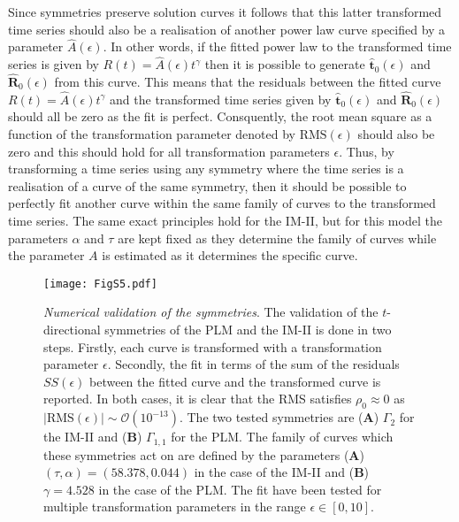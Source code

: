 Since symmetries preserve solution curves it follows that this latter transformed time series should also be a realisation of another power law curve specified by a parameter $\hat{A}(\epsilon)$. In other words, if the fitted power law to the transformed time series is given by $R(t)=\hat{A}(\epsilon)t^{\gamma}$ then it is possible to generate $\mathbf{\hat{t}}_0(\epsilon)$ and $\mathbf{\hat{R}}_0(\epsilon)$ from this curve. This means that the residuals between the fitted curve $R(t)=\hat{A}(\epsilon)t^{\gamma}$ and the transformed time series given by $\mathbf{\hat{t}}_0(\epsilon)$ and $\mathbf{\hat{R}}_0(\epsilon)$ should all be zero as the fit is perfect. Consquently, the root mean square as a function of the transformation parameter denoted by $\mathrm{RMS}(\epsilon)$ should also be zero and this should hold for all transformation parameters $\epsilon$. Thus, by transforming a time series using any symmetry where the time series is a realisation of a curve of the same symmetry, then it should be possible to perfectly fit another curve within the same family of curves to the transformed time series. The same exact principles hold for the IM-II, but for this model the parameters $\alpha$ and $\tau$ are kept fixed as they determine the family of curves while the parameter $A$ is estimated as it determines the specific curve.

   





\begin{figure}[htbp!]
  \texttt{[image: FigS5.pdf]}
  \caption[Numerical validation of the symmetries]{\textit{Numerical validation of the symmetries}. The validation of the $t$-directional symmetries of the PLM and the IM-II is done in two steps. Firstly, each curve is transformed with a transformation parameter $\epsilon$. Secondly, the fit in terms of the sum of the residuals $SS(\epsilon)$ between the fitted curve and the transformed curve is reported. In both cases, it is clear that the RMS satisfies $\rho_0\approx 0$ as $|\mathrm{RMS}(\epsilon)|\sim\mathcal{O}\left(10^{-13}\right)$. The two tested symmetries are (\textbf{A}) $\Gamma_2$ for the IM-II and (\textbf{B}) $\Gamma_{1,1}$ for the PLM. The family of curves which these symmetries act on are defined by the parameters (\textbf{A}) $(\tau,\alpha)=(58.378,0.044)$ in the case of the IM-II and (\textbf{B}) $\gamma=4.528$ in the case of the PLM. The fit have been tested for multiple transformation parameters in the range $\epsilon\in [0,10]$. } 
  \label{fig:numerical_validation}
  \end{figure}



